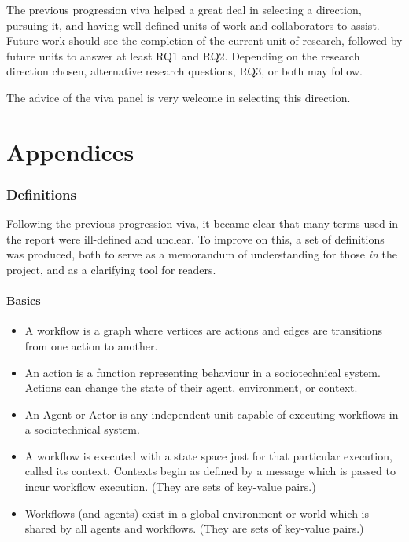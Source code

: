 \documentclass[11pt]{article}
\begin{document}
The previous progression viva helped a great deal in selecting a direction,
pursuing it, and having well-defined units of work and collaborators to assist.
Future work should see the completion of the current unit of research, followed
by future units to answer at least RQ1 and RQ2. Depending on the research
direction chosen, alternative research questions, RQ3, or both may follow.

The advice of the viva panel is very welcome in selecting this direction.


\newpage
{}






\newpage
\part{Appendices}
\appendix
\label{part:appendices}

\section{Definitions}
\label{sec:org0addd5a}
\label{app:definitions}


Following the previous progression viva, it became clear that many terms used in
the report were ill-defined and unclear. To improve on this, a set of
definitions was produced, both to serve as a memorandum of understanding for
those \emph{in} the project, and as a clarifying tool for readers.

\subsection{Basics}
\label{sec:org8a2c738}

\begin{itemize}
\item A workflow is a graph where vertices are actions and edges are transitions from one action to another.
\item An action is a function representing behaviour in a sociotechnical system. Actions can change the state of their agent, environment, or context.
\item An Agent or Actor is any independent unit capable of executing workflows in a sociotechnical system.
\item A workflow is executed with a state space just for that particular execution, called its context. Contexts begin as defined by a message which is passed to incur workflow execution. (They are sets of key-value pairs.)
\item Workflows (and agents) exist in a global environment or world which is shared by all agents and workflows. (They are sets of key-value pairs.)
\end{itemize}
\end{document}
